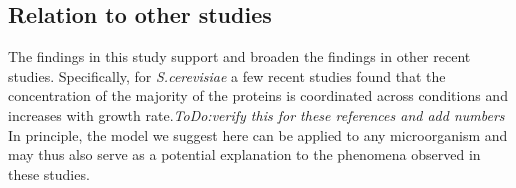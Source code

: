 \subsection{Relation to other studies}
The findings in this study support and broaden the findings in other recent studies.
Specifically, for \emph{S.cerevisiae} a few recent studies found that the concentration of the majority of the proteins is coordinated across conditions \cite{Keren2013a, Gasch2000, Brauer2008a} and increases with growth rate.\emph{ToDo:verify this for these references and add numbers} 
In principle, the model we suggest here can be applied to any microorganism and may thus also serve as a potential explanation to the phenomena observed in these studies.
